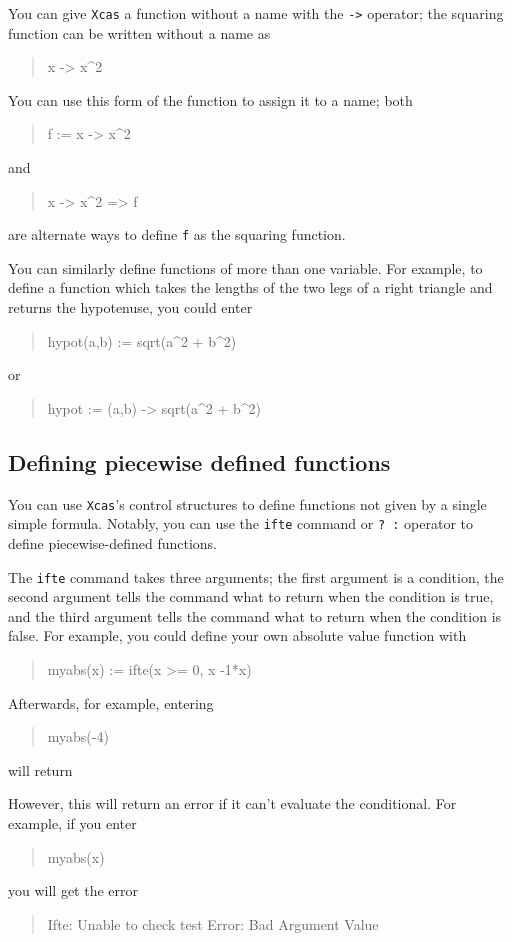 \documentclass[a4paper,11pt]{book}
\newenvironment{giaccmd}
{\begin{quote}\ttfamily}
{\end{quote}}
\begin{document}
You can give \texttt{Xcas} a function without a name with the
\texttt{->}\index{->} operator; the squaring function can be written
without a name as
\begin{giaccmd}
  x -> x\^{}2
\end{giaccmd}
You can use this form of the function to assign it to a name; both
\begin{giaccmd}
  f := x -> x\^{}2
\end{giaccmd}
and
\begin{giaccmd}
  x -> x\^{}2 => f
\end{giaccmd}
are alternate ways to define \texttt{f} as the squaring function.

You can similarly define functions of more than one variable.  For
example, to define a function which takes the lengths of the two legs
of a right triangle and returns the hypotenuse, you could enter
\begin{giaccmd}
  hypot(a,b) := sqrt(a\^{}2 + b\^{}2)
\end{giaccmd}
or
\begin{giaccmd}
  hypot := (a,b) -> sqrt(a\^{}2 + b\^{}2)
\end{giaccmd}

\subsection{Defining piecewise defined functions}

You can use \texttt{Xcas}'s control structures to define functions not
given by a single simple formula.  Notably, you can use the
\texttt{ifte} command or \texttt{? :} operator
to define piecewise-defined functions.

The \texttt{ifte} command takes three arguments; the first argument is
a condition, the second argument tells the command what to return when
the condition is true, and the third argument tells the command what
to return when the condition is false.  For example, you could define
your own absolute value function with
\begin{giaccmd}
  myabs(x) := ifte(x >= 0, x -1*x)
\end{giaccmd}
Afterwards, for example, entering
\begin{giaccmd}
  myabs(-4)
\end{giaccmd}
will return
\begin{giaccmd}
  4
\end{giaccmd}
However, this will return an error if it can't evaluate the
conditional.  For example, if you enter
\begin{giaccmd}
  myabs(x)
\end{giaccmd}
you will get the error
\begin{giaccmd}
  Ifte: Unable to check test Error: Bad Argument Value
\end{giaccmd}
\end{document}

